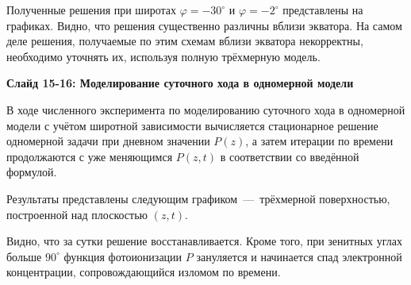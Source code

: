\documentclass[2pt, a4paper, fleqn]{extarticle}
\begin{document}
Полученные решения при широтах $\varphi = -30^\circ$ и $\varphi=-2^\circ$ представлены на графиках. Видно, что решения существенно различны вблизи экватора. На самом деле решения, получаемые по этим схемам вблизи экватора некорректны, необходимо уточнять их, используя полную трёхмерную модель.

\medskip

{\bf Слайд 15-16: Моделирование суточного хода в одномерной модели}

В ходе численного эксперимента по моделированию суточного хода в одномерной модели с учётом широтной зависимости вычисляется стационарное решение одномерной задачи при дневном значении $P(z)$, а затем итерации по времени продолжаются с уже меняющимся $P(z, t)$ в соответствии со введённой формулой.

Результаты представлены следующим графиком~---~трёхмерной поверхностью, построенной над плоскостью $(z, t)$.

Видно, что за сутки решение восстанавливается. Кроме того, при зенитных углах больше $90^\circ$ функция фотоионизации $P$ зануляется и начинается спад электронной концентрации, сопровождающийся изломом по времени.
\end{document}
